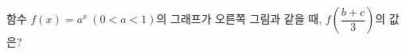 \noindent\begin{minipage}[t]{0.58\linewidth}\vspace{0pt}\raggedright 함수 $f(x)=a^{x}\ (0<a<1)$의 그래프가 오른쪽 그림과 같을 때, $f\left(\dfrac{b+c}{3}\right)$의 값은? \end{minipage}\hfill\begin{minipage}[t]{0.4\linewidth}\vspace{0pt}\centering \resizebox{\ifdim\width>\linewidth\linewidth\else\width\fi}{!}{}\end{minipage}\par
{}
